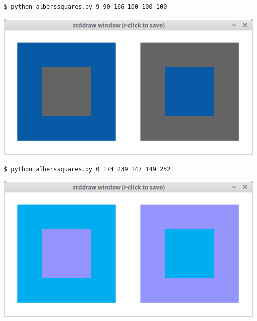 \documentclass[8pt,a4paper,compress,handout]{beamer}
\begin{document}
\begin{frame}[fragile]
\begin{minipage}{180pt}
\begin{lstlisting}[language={}]
$ python alberssquares.py 9 90 166 100 100 100
\end{lstlisting}
\end{minipage}%
\begin{minipage}{120pt}
\begin{center}
\hfill \includegraphics[scale=0.17]{figures/albers1.png}
\end{center}
\end{minipage}

\bigskip

\begin{minipage}{180pt}
\begin{lstlisting}[language={}]
$ python alberssquares.py 0 174 239 147 149 252
\end{lstlisting}
\end{minipage}%
\begin{minipage}{120pt}
\begin{center}
\hfill \includegraphics[scale=0.17]{figures/albers2.png}
\end{center}
\end{minipage}
\end{frame}
\end{document}
